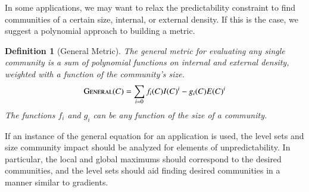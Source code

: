 \documentclass[phd,tocprelim]{cornell}
\newtheorem{definition}{Definition}
\begin{document}
In some applications, we may want to relax the predictability constraint to find communities of a certain size, internal, or external density.  If this is the case, we suggest a polynomial approach to building a metric.
\begin{definition}[General Metric] The general metric for evaluating any single community is a sum of polynomial functions on internal and external density, weighted with a function of the community's size.
  \begin{equation}
   \mbox{\sc General}(C) = \sum\limits_{i = 0} f_i(C) I(C)^i - g_i(C) E(C)^i
  \end{equation}
The functions $f_i$ and $g_i$ can be any function of the size of a community.
\end{definition}
If an instance of the general equation for an application is used, the level sets and size community impact should be analyzed for elements of unpredictability.  In particular, the local and global maximums should correspond to the desired communities, and the level sets should aid finding desired communities in a manner similar to gradients.
\end{document}
